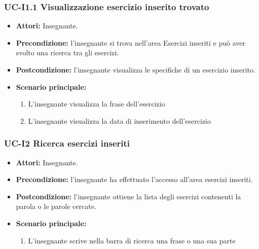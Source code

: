 \subsubsection{UC-I1.1 Visualizzazione esercizio inserito trovato}
\begin{itemize}
\item \textbf{Attori: }Insegnante.
		\item \textbf{Precondizione: }l'insegnante si trova nell'area Esercizi inseriti e può aver svolto una ricerca tra gli esercizi.
		\item \textbf{Postcondizione: }l'insegnante visualizza le specifiche di un esercizio inserito. 
		\item \textbf{Scenario principale:}
		\begin{enumerate}
			\item L'insegnante visualizza la frase dell'esercizio
			\item L'insegnante visualizza la data di inserimento dell'esercizio
		\end{enumerate}
	\end{itemize}

\subsubsection{UC-I2 Ricerca esercizi inseriti}
\begin{itemize}
	\item \textbf{Attori:} Insegnante.
	\item \textbf{Precondizione:} l'insegnante ha effettuato l'accesso all'area esercizi inseriti.
	\item \textbf{Postcondizione:} l'insegnante ottiene la lista degli esercizi contenenti la parola o le parole cercate.
	\item \textbf{Scenario principale:}
		\begin{enumerate}
				\item L'insegnante scrive nella barra di ricerca una frase o una sua parte
		\end{enumerate}
\end{itemize}


